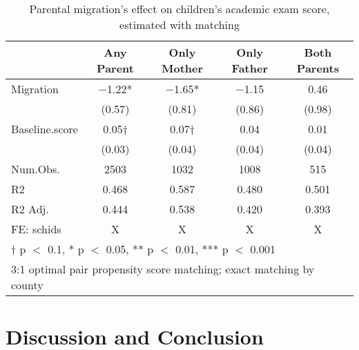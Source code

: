 \documentclass[
  man,floatsintext]{apa7}
\begin{document}
\newpage

\begin{table}

\caption{Parental migration’s effect on children’s academic exam score, estimated with matching}
\centering
\begin{tabular}[t]{lcccc}
\toprule
  & Any Parent & Only Mother & Only Father & Both Parents\\
\midrule
Migration & \num{-1.22}* & \num{-1.65}* & \num{-1.15} & \num{0.46}\\
 & (\num{0.57}) & (\num{0.81}) & (\num{0.86}) & (\num{0.98})\\
Baseline.score & \num{0.05}† & \num{0.07}† & \num{0.04} & \num{0.01}\\
 & (\num{0.03}) & (\num{0.04}) & (\num{0.04}) & (\num{0.04})\\
\midrule
Num.Obs. & \num{2503} & \num{1032} & \num{1008} & \num{515}\\
R2 & \num{0.468} & \num{0.587} & \num{0.480} & \num{0.501}\\
R2 Adj. & \num{0.444} & \num{0.538} & \num{0.420} & \num{0.393}\\
FE: schids & X & X & X & X\\
\bottomrule
\multicolumn{5}{l}{\rule{0pt}{1em}† p $<$ 0.1, * p $<$ 0.05, ** p $<$ 0.01, *** p $<$ 0.001}\\
\multicolumn{5}{l}{\rule{0pt}{1em}3:1 optimal pair propensity score matching; exact matching by county}\\
\end{tabular}
\end{table}

\newpage

\hypertarget{discussion-and-conclusion}{%
\section{Discussion and Conclusion}\label{discussion-and-conclusion}}
\end{document}
